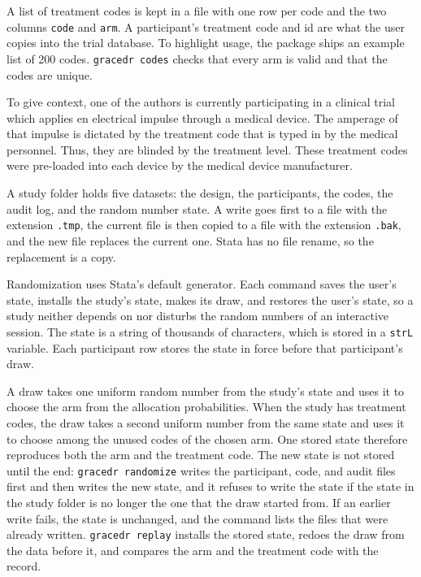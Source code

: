 \documentclass[bib]{statapress}
\begin{document}
A list of treatment codes is kept in a file with one row per code and the two
columns \texttt{code} and \texttt{arm}. A participant's treatment code and id are
what the user copies into the trial database. To highlight usage, the package ships an example list
of 200 codes. \texttt{gracedr codes} checks that every arm is valid and that the
codes are unique.

To give context, one of the authors is currently participating in a clinical trial
which applies en electrical impulse through a medical device.  The amperage
of that impulse is dictated by the treatment code that is typed in by the
medical personnel.  Thus, they are blinded by the treatment level.  These
treatment codes were pre-loaded into each device by the medical device manufacturer. 

A study folder holds five datasets: the design, the participants, the codes, the
audit log, and the random number state. A write goes first to a file with the
extension \texttt{.tmp}, the current file is then copied to a file with the
extension \texttt{.bak}, and the new file replaces the current one. Stata has no
file rename, so the replacement is a copy.

Randomization uses Stata's default generator. Each command saves the user's
state, installs the study's state, makes its draw, and restores the user's state,
so a study neither depends on nor disturbs the random numbers of an interactive
session. The state is a string of thousands of characters, which is stored in a
\texttt{strL} variable. Each participant row stores the state in force before
that participant's draw.

A draw takes one uniform random number from the study's state and uses it to
choose the arm from the allocation probabilities. When the study has treatment
codes, the draw takes a second uniform number from the same state and uses it to
choose among the unused codes of the chosen arm. One stored state therefore
reproduces both the arm and the treatment code. The new state is not stored
until the end: \texttt{gracedr randomize} writes the participant, code, and audit
files first and then writes the new state, and it refuses to write the state if
the state in the study folder is no longer the one that the draw started from. If
an earlier write fails, the state is unchanged, and the command lists the files that
were already written. \texttt{gracedr replay} installs the stored state, redoes the
draw from the data before it, and compares the arm and the treatment code with
the record.
\end{document}

